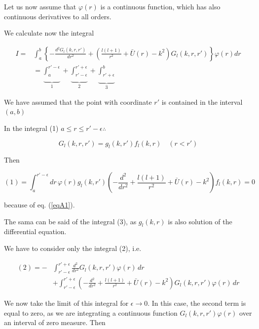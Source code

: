 \documentclass[a4paper,14pt]{book}
\begin{document}
Let us now assume that $\varphi(r)$ is a continuous function, which has also continuous derivatives to all orders.

We calculate now the integral

\begin{equation}\label{eqA10}
\begin{split}
I=& \int_a^b\left\lbrace -\frac{d^2G_l(k,r,r')}{dr^2}+\left( \frac{l(l+1)}{r^2}+\bar U(r)-k^2\right) G_l(k,r,r')\right\rbrace \varphi(r) dr\\
&=\underbrace{\int_a^{r'-\epsilon}}_{1}+\underbrace{\int_{r'-\epsilon}^{r'+\epsilon}}_{2}+
\underbrace{\int_{r'+\epsilon}^b}_{\text{3}}
\end{split}
\end{equation}


We have assumed that the point with coordinate $r'$ is contained in the interval $(a,b)$

In the integral (1) $a\leq r  \leq r'-\epsilon \therefore $

\begin{equation*}
G_l(k,r,r')=g_l(k,r')f_l(k,r) \quad (r<  r')
\end{equation*}


Then

\begin{equation}\label{eqA11}
(1)=\int_a^{r'-\epsilon} dr\, \varphi(r) g_l(k,r') \left(-\frac{d^2}{dr^2}+ \frac{l(l+1)}{r^2}+\bar U(r)-k^2\right) f_l(k,r) =0
\end{equation}

because of eq. (\ref{eqA1}).

The sama can be said of the integral (3), as $g_l(k,r)$ is also solution of the differential equation.


We have to consider only the integral (2), i.e.

\begin{equation}\label{eqA12}
\begin{split}
(2)=-&\int_{r'-\epsilon}^{r'+\epsilon}  \frac{d^2}{dr^2} G_l(k,r,r') \varphi(r) \,dr \\
&+\int_{r'-\epsilon}^{r'+\epsilon} \left(-\frac{d^2}{dr^2}+ \frac{l(l+1)}{r^2}+\bar U(r)-k^2\right)
 G_l(k,r,r') \varphi(r) \,dr
\end{split}
\end{equation}

We now take the limit of this integral for $\epsilon \rightarrow 0$. In this case, the second term is equal to zero, as we are integrating a continuous function $G_l(k,r,r') \varphi(r)$ over an interval of zero measure. Then
\end{document}
